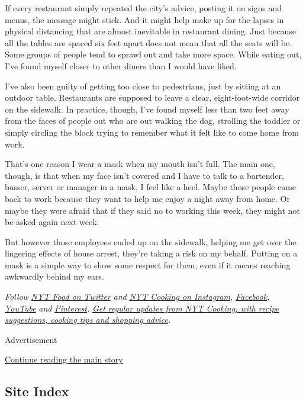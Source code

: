 If every restaurant simply repeated the city's advice, posting it on
signs and menus, the message might stick. And it might help make up for
the lapses in physical distancing that are almost inevitable in
restaurant dining. Just because all the tables are spaced six feet apart
does not mean that all the seats will be. Some groups of people tend to
sprawl out and take more space. While eating out, I've found myself
closer to other diners than I would have liked.

I've also been guilty of getting too close to pedestrians, just by
sitting at an outdoor table. Restaurants are supposed to leave a clear,
eight-foot-wide corridor on the sidewalk. In practice, though, I've
found myself less than two feet away from the faces of people out who
are out walking the dog, strolling the toddler or simply circling the
block trying to remember what it felt like to come home from work.

That's one reason I wear a mask when my mouth isn't full. The main one,
though, is that when my face isn't covered and I have to talk to a
bartender, busser, server or manager in a mask, I feel like a heel.
Maybe those people came back to work because they want to help me enjoy
a night away from home. Or maybe they were afraid that if they said no
to working this week, they might not be asked again next week.

But however those employees ended up on the sidewalk, helping me get
over the lingering effects of house arrest, they're taking a risk on my
behalf. Putting on a mask is a simple way to show some respect for them,
even if it means reaching awkwardly behind my ears.

\emph{Follow} \href{https://twitter.com/nytfood}{\emph{NYT Food on
Twitter}} \emph{and}
\href{https://www.instagram.com/nytcooking/}{\emph{NYT Cooking on
Instagram}}\emph{,}
\href{https://www.facebookcorewwwi.onion/nytcooking/}{\emph{Facebook}}\emph{,}
\href{https://www.youtube.com/nytcooking}{\emph{YouTube}} \emph{and}
\href{https://www.pinterest.com/nytcooking/}{\emph{Pinterest}}\emph{.}
\href{https://www.nytimes3xbfgragh.onion/newsletters/cooking}{\emph{Get
regular updates from NYT Cooking, with recipe suggestions, cooking tips
and shopping advice}}\emph{.}

Advertisement

\protect\hyperlink{after-bottom}{Continue reading the main story}

\hypertarget{site-index}{%
\subsection{Site Index}\label{site-index}}

